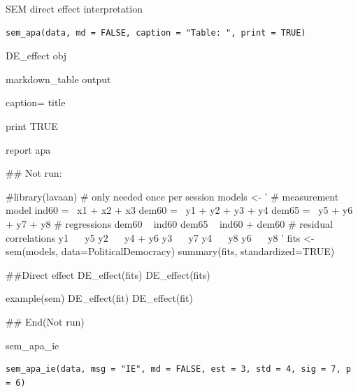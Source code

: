 \documentclass[a4paper]{book}
\begin{document}
%
\begin{Description}
SEM direct effect interpretation
\end{Description}
%
\begin{Usage}
\begin{verbatim}
sem_apa(data, md = FALSE, caption = "Table: ", print = TRUE)
\end{verbatim}
\end{Usage}
%
\begin{Arguments}
\begin{ldescription}
\item[\code{data}] DE\_effect obj

\item[\code{md}] markdown\_table output

\item[\code{caption}] caption= title

\item[\code{print}] print TRUE
\end{ldescription}
\end{Arguments}
%
\begin{Value}
report apa
\end{Value}
%
\begin{Examples}
\begin{ExampleCode}

\#\# Not run: 

 #library(lavaan) # only needed once per session
 models <- '
   # measurement model
     ind60 =~ x1 + x2 + x3
     dem60 =~ y1 + y2 + y3 + y4
     dem65 =~ y5 + y6 + y7 + y8
 # regressions
     dem60 ~ ind60
     dem65 ~ ind60 + dem60
   # residual correlations
     y1 ~~ y5
     y2 ~~ y4 + y6
     y3 ~~ y7
     y4 ~~ y8
    y6 ~~ y8
 '
 fits <- sem(models, data=PoliticalDemocracy)
 summary(fits, standardized=TRUE)

 ##Direct effect
 DE_effect(fits)
 DE_effect(fits)%

example(sem)
DE_effect(fit)
DE_effect(fit) %


## End(Not run)

\end{ExampleCode}
\end{Examples}
%
\begin{Description}
sem\_apa\_ie
\end{Description}
%
\begin{Usage}
\begin{verbatim}
sem_apa_ie(data, msg = "IE", md = FALSE, est = 3, std = 4, sig = 7, p = 6)
\end{verbatim}
\end{Usage}
\end{document}
